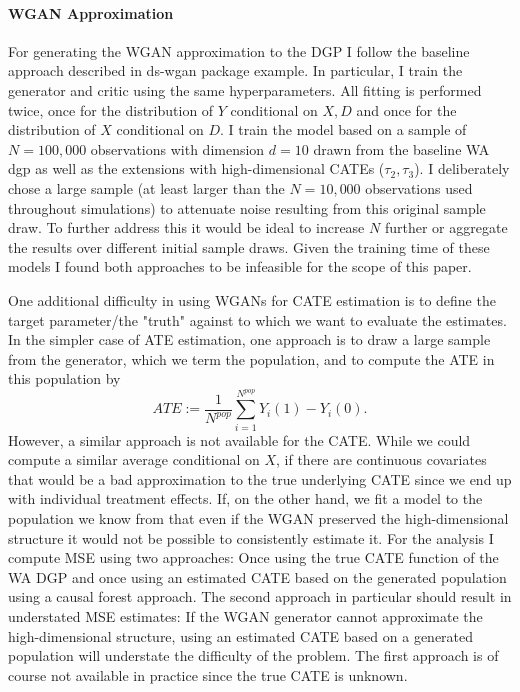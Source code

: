 \documentclass[11pt, a4paper, leqno]{article}
\begin{document}
\paragraph*{WGAN Approximation}
For generating the WGAN approximation to the DGP I follow the baseline approach described in ds-wgan package example.
In particular, I train the generator and critic using the same hyperparameters.
All fitting is performed twice, once for the distribution of $Y$ conditional on $X, D$ and once for the distribution of $X$ conditional on $D$.
I train the model based on a sample of $N=100,000$ observations with dimension $d=10$ drawn from the baseline WA dgp as well as the extensions with high-dimensional CATEs ($\tau_2, \tau_3$).
I deliberately chose a large sample (at least larger than the $N=10,000$ observations used throughout simulations) to attenuate noise resulting from this original sample draw.
To further address this it would be ideal to increase $N$ further or aggregate the results over different initial sample draws.
Given the training time of these models I found both approaches to be infeasible for the scope of this paper.

One additional difficulty in using WGANs for CATE estimation is to define the target parameter/the "truth" against to which we want to evaluate the estimates.
In the simpler case of ATE estimation, one approach is to draw a large sample from the generator, which we term the population, and to compute the ATE in this population by
\begin{equation*}
    ATE := \frac{1}{N^{pop}} \sum_{i=1}^{N^{pop}} Y_i(1) - Y_i(0).
\end{equation*}
However, a similar approach is not available for the CATE\@.
While we could compute a similar average conditional on $X$, if there are continuous covariates that would be a bad approximation to the true underlying CATE since we end up with individual treatment effects.
If, on the other hand, we fit a model to the population we know from that even if the WGAN preserved the high-dimensional structure it would not be possible to consistently estimate it.
For the analysis I compute MSE using two approaches: Once using the true CATE function of the WA DGP and once using an estimated CATE based on the generated population using a causal forest approach.
The second approach in particular should result in understated MSE estimates: If the WGAN generator cannot approximate the high-dimensional structure, using an estimated CATE based on a generated population will understate the difficulty of the problem.
The first approach is of course not available in practice since the true CATE is unknown.
\end{document}
